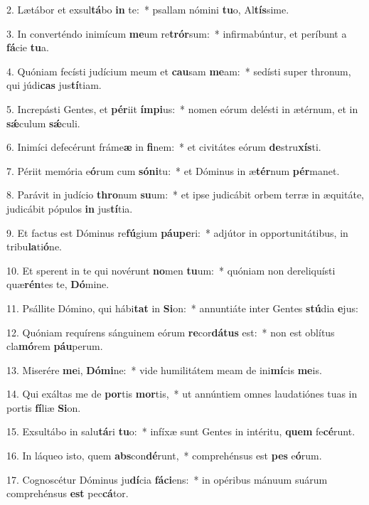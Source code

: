 2. Lætábor et exsul\textbf{tá}bo \textbf{in} te:~*  psallam nómini \textbf{tu}o, Al\textbf{tís}sime.\

3. In converténdo inimícum \textbf{me}um re\textbf{trór}sum:~*  infirmabúntur, et períbunt a \textbf{fá}cie \textbf{tu}a.\

4. Quóniam fecísti judícium meum et \textbf{cau}sam \textbf{me}am:~*  sedísti super thronum, qui júdi\textbf{cas} jus\textbf{tí}tiam.\

5. Increpásti Gentes, et \textbf{pér}iit \textbf{ím}\textbf{pi}us:~*  nomen eórum delésti in ætérnum, et in \textbf{sǽ}culum \textbf{sǽ}culi.\

6. Inimíci defecérunt fráme\textbf{æ} in \textbf{fi}nem:~*  et civitátes eórum \textbf{de}stru\textbf{xís}ti.\

7. Périit memória e\textbf{ó}rum cum \textbf{só}\textbf{ni}tu:~*  et Dóminus in æ\textbf{tér}num \textbf{pér}manet.\

8. Parávit in judício \textbf{thro}num \textbf{su}um:~*  et ipse judicábit orbem terræ in æquitáte, judicábit pópulos \textbf{in} jus\textbf{tí}tia.\

9. Et factus est Dóminus re\textbf{fú}gium \textbf{páu}\textbf{pe}ri:~*  adjútor in opportunitátibus, in tribu\textbf{la}ti\textbf{ó}ne.\

10. Et sperent in te qui novérunt \textbf{no}men \textbf{tu}um:~*  quóniam non dereliquísti quæ\textbf{rén}tes te, \textbf{Dó}mine.\

11. Psállite Dómino, qui hábi\textbf{tat} in \textbf{Si}on:~*  annuntiáte inter Gentes \textbf{stú}dia \textbf{e}jus:\

12. Quóniam requírens sánguinem eórum \textbf{re}cor\textbf{dá}\textbf{tus} est:~*  non est oblítus cla\textbf{mó}rem \textbf{páu}perum.\

13. Miserére \textbf{me}i, \textbf{Dó}\textbf{mi}ne:~*  vide humilitátem meam de ini\textbf{mí}cis \textbf{me}is.\

14. Qui exáltas me de \textbf{por}tis \textbf{mor}tis,~*  ut annúntiem omnes laudatiónes tuas in portis \textbf{fí}liæ \textbf{Si}on.\

15. Exsultábo in salu\textbf{tá}ri \textbf{tu}o:~*  infíxæ sunt Gentes in intéritu, \textbf{quem} fe\textbf{cé}runt.\

16. In láqueo isto, quem \textbf{abs}con\textbf{dé}runt,~*  comprehénsus est \textbf{pes} e\textbf{ó}rum.\

17. Cognoscétur Dóminus ju\textbf{dí}cia \textbf{fá}\textbf{ci}ens:~*  in opéribus mánuum suárum comprehénsus \textbf{est} pec\textbf{cá}tor.\


